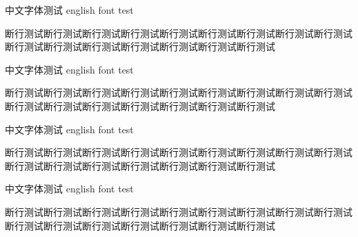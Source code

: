 \documentclass[../../main.tex]{subfiles}
\begin{document}
\begin{lemma}
中文字体测试 english font test\par
断行测试断行测试断行测试断行测试断行测试断行测试断行测试断行测试断行测试断行测试断行测试断行测试断行测试断行测试断行测试断行测试\par
\end{lemma}


\begin{corollary}
中文字体测试 english font test\par
断行测试断行测试断行测试断行测试断行测试断行测试断行测试断行测试断行测试断行测试断行测试断行测试断行测试断行测试断行测试断行测试\par
\end{corollary}

\begin{example}
中文字体测试 english font test\par
断行测试断行测试断行测试断行测试断行测试断行测试断行测试断行测试断行测试断行测试断行测试断行测试断行测试断行测试断行测试断行测试\par
\end{example}

\begin{remark}
中文字体测试 english font test\par
断行测试断行测试断行测试断行测试断行测试断行测试断行测试断行测试断行测试断行测试断行测试断行测试断行测试断行测试断行测试断行测试\par
\end{remark}
\end{document}
